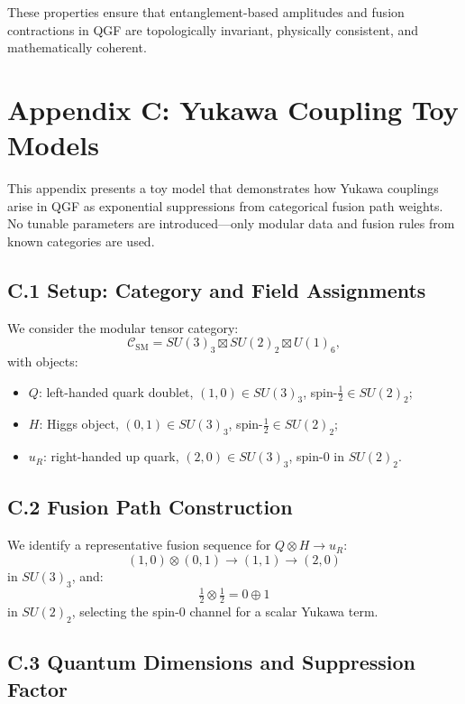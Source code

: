 \documentclass[11pt]{article}
\begin{document}
These properties ensure that entanglement-based amplitudes and fusion contractions in QGF are topologically invariant, physically consistent, and mathematically coherent.



\section*{Appendix C: Yukawa Coupling Toy Models}

This appendix presents a toy model that demonstrates how Yukawa couplings arise in QGF as exponential suppressions from categorical fusion path weights. No tunable parameters are introduced—only modular data and fusion rules from known categories are used.

\subsection*{C.1 Setup: Category and Field Assignments}

We consider the modular tensor category:
\[
\mathcal{C}_{\text{SM}} = SU(3)_3 \boxtimes SU(2)_2 \boxtimes U(1)_6,
\]
with objects:
\begin{itemize}
  \item \( Q \): left-handed quark doublet, \( (1,0) \in SU(3)_3 \), spin-\( \tfrac{1}{2} \in SU(2)_2 \);
  \item \( H \): Higgs object, \( (0,1) \in SU(3)_3 \), spin-\( \tfrac{1}{2} \in SU(2)_2 \);
  \item \( u_R \): right-handed up quark, \( (2,0) \in SU(3)_3 \), spin-0 in \( SU(2)_2 \).
\end{itemize}

\subsection*{C.2 Fusion Path Construction}

We identify a representative fusion sequence for \( Q \otimes H \to u_R \):
\[
(1,0) \otimes (0,1) \rightarrow (1,1) \rightarrow (2,0)
\]
in \( SU(3)_3 \), and:
\[
\tfrac{1}{2} \otimes \tfrac{1}{2} = 0 \oplus 1
\]
in \( SU(2)_2 \), selecting the spin-0 channel for a scalar Yukawa term.

\subsection*{C.3 Quantum Dimensions and Suppression Factor}
\end{document}
